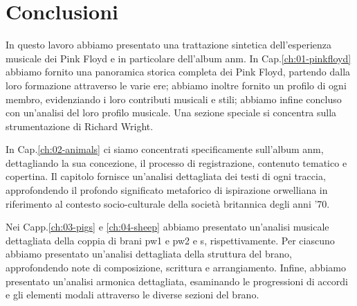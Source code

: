 \documentclass[class=book, crop=false, oneside, 12pt]{standalone}
\begin{document}
\chapter*{Conclusioni}

In questo lavoro abbiamo presentato una trattazione sintetica dell'esperienza musicale dei Pink Floyd e in particolare dell'album \acrlong{anm}. In Cap.\ref{ch:01-pinkfloyd} abbiamo fornito una panoramica storica completa dei Pink Floyd, partendo dalla loro formazione attraverso le varie ere; abbiamo inoltre fornito un profilo di ogni membro, evidenziando i loro contributi musicali e stili; abbiamo infine concluso con un'analisi del loro profilo musicale. Una sezione speciale si concentra sulla strumentazione di Richard Wright.

In Cap.\ref{ch:02-animals} ci siamo concentrati specificamente sull'album \acrshort{anm}, dettagliando la sua concezione, il processo di registrazione, contenuto tematico e copertina. Il capitolo fornisce un'analisi dettagliata dei testi di ogni traccia, approfondendo il profondo significato metaforico di ispirazione orwelliana in riferimento al contesto socio-culturale della società britannica degli anni '70.

Nei Capp.\ref{ch:03-pigs} e \ref{ch:04-sheep} abbiamo presentato un'analisi musicale dettagliata della coppia di brani \acrlong{pw1} e \acrlong{pw2} e \acrlong{s}, rispettivamente. Per ciascuno abbiamo presentato un'analisi dettagliata della struttura del brano, approfondendo note di composizione, scrittura e arrangiamento. Infine, abbiamo presentato un'analisi armonica dettagliata, esaminando le progressioni di accordi e gli elementi modali attraverso le diverse sezioni del brano.
\end{document}
